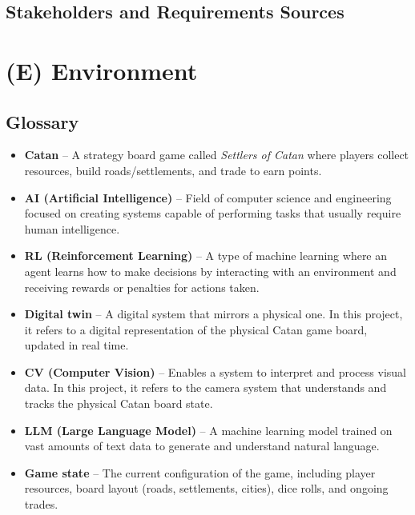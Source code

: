 \documentclass{article}
\begin{document}
\subsection{Stakeholders and Requirements Sources}\label{subsec:stakeholders-and-requirements-sources}

\newpage{}


\section*{(E) Environment}\label{sec:srs-environment}
\renewcommand{\thesubsection}{E.\arabic{subsection}}
\setcounter{subsection}{0}

\subsection{Glossary}\label{subsec:glossary}
\begin{itemize}
    \item \textbf{Catan} – A strategy board game called \textit{Settlers of Catan} where players collect resources, build roads/settlements, and trade to earn points.
    \item \textbf{AI (Artificial Intelligence)} – Field of computer science and engineering focused on creating systems capable of performing tasks that usually require human intelligence.
    \item \textbf{RL (Reinforcement Learning)} – A type of machine learning where an agent learns how to make decisions by interacting with an environment and receiving rewards or penalties for actions taken.
    \item \textbf{Digital twin} – A digital system that mirrors a physical one. In this project, it refers to a digital representation of the physical Catan game board, updated in real time.
    \item \textbf{CV (Computer Vision)} – Enables a system to interpret and process visual data. In this project, it refers to the camera system that understands and tracks the physical Catan board state.
    \item \textbf{LLM (Large Language Model)} – A machine learning model trained on vast amounts of text data to generate and understand natural language.
    \item \textbf{Game state} – The current configuration of the game, including player resources, board layout (roads, settlements, cities), dice rolls, and ongoing trades.
\end{itemize}
\end{document}
